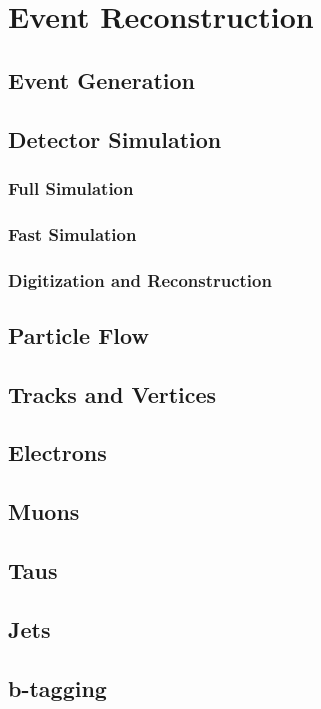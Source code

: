 \chapter{Event Reconstruction
\label{ch:reconstruction}}

\section{Event Generation}

\section{Detector Simulation}

\subsection{Full Simulation}

\subsection{Fast Simulation}

\subsection{Digitization and Reconstruction}
\label{ch:digireco}

\section{Particle Flow}

\section{Tracks and Vertices}

\section{Electrons}

\section{Muons}

\section{Taus}

\section{Jets}

\section{b-tagging}